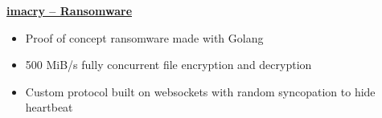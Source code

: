 \textbf{\href{https://github.com/prairir/imacry}{imacry -- Ransomware}} \par

\begin{itemize}
    \item Proof of concept ransomware made with Golang
    \item 500 MiB/s fully concurrent file encryption and decryption
    \item Custom protocol built on websockets with random syncopation to hide heartbeat
\end{itemize}
